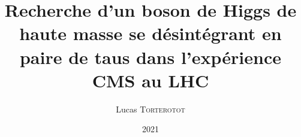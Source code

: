 \documentclass[11pt,a4paper,twoside]{book}
\institute[UCBL]{Université Claude Bernard Lyon 1} %
\title{Recherche d'un boson de Higgs de haute masse se désintégrant en paire de taus dans l'expérience CMS au LHC}
\author[L. \textsc{Torterotot}]{Lucas \textsc{Torterotot}}
\date{\todo{XX xxxx} 2021}
\begin{document}
\pagestyle{empty}

\cleardoublepage
~\vfill
\begin{flushright}
\end{flushright}
\vfill\vfill~
\cleardoublepage

\cleardoublepage
\frontmatter
\tableofcontents

\mainmatter


\appendix

\backmatter
\printbibliography
\end{document}

